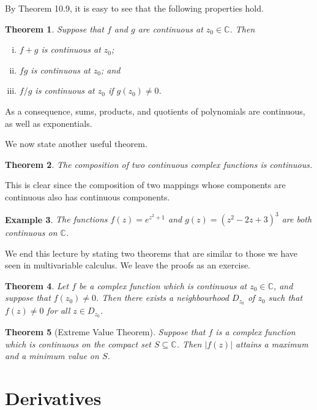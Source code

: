 \documentclass[10pt]{article}
\makeatletter
\newcommand{\C}{\mathbb{C}}
\theoremstyle{newstyle}
\newtheorem{thm}{Theorem}[section]
\newtheorem{exmp}[thm]{Example}
\newenvironment{pf}[1][\proofname]{\par
  \pushQED{\qed}%
  \normalfont \topsep0\p@\relax
  \trivlist
  \item[\hskip\labelsep\scshape
  #1\@addpunct{.}]\ignorespaces
}{%
  \popQED\endtrivlist\@endpefalse
}
\makeatother
\begin{document}
By Theorem 10.9, it is easy to see that the following properties hold. 

\begin{thm}
Suppose that $f$ and $g$ are continuous at $z_0 \in \C$. Then 
\begin{enumerate}[(i)]
    \item $f + g$ is continuous at $z_0$;
    \item $fg$ is continuous at $z_0$; and 
    \item $f/g$ is continuous at $z_0$ if $g(z_0) \neq 0$. 
\end{enumerate}
\end{thm}
As a consequence, sums, products, and quotients of polynomials are continuous, as well as 
exponentials. 

We now state another useful theorem.

\begin{thm}
The composition of two continuous complex functions is continuous.
\end{thm}
\begin{pf}
This is clear since the composition of two mappings whose components are continuous 
also has continuous components. 
\end{pf}

\begin{exmp}
The functions $f(z) = e^{z^2+1}$ and $g(z) = (z^2-2z+3)^3$ are both continuous on $\C$. 
\end{exmp}

We end this lecture by stating two theorems that are similar to those we have seen in 
multivariable calculus. We leave the proofs as an exercise. 

\begin{thm}
Let $f$ be a complex function which is continuous at $z_0 \in \C$, and suppose that 
$f(z_0) \neq 0$. Then there exists a neighbourhood $D_{z_0}$ of $z_0$ such that 
$f(z) \neq 0$ for all $z \in D_{z_0}$. 
\end{thm}

\begin{thm}[Extreme Value Theorem]
Suppose that $f$ is a complex function which is continuous on the compact set $S \subseteq \C$. 
Then $|f(z)|$ attains a maximum and a minimum value on $S$. 
\end{thm}

\newpage 
\section{Derivatives}
\end{document}
